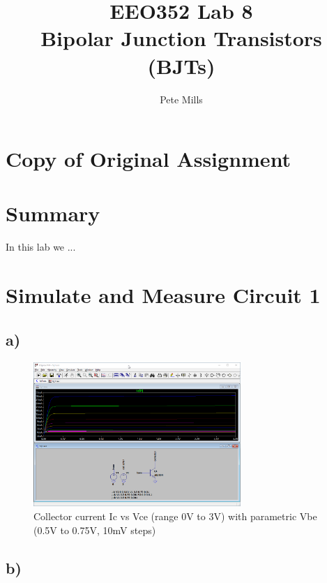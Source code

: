 \documentclass{article}
\begin{document}
	
	
	\title{EEO352 Lab 8\\ Bipolar Junction Transistors (BJTs)}
	\author{Pete Mills}
	
	\maketitle
	
	\section*{Copy of Original Assignment}
	
	
	
	
	\section*{Summary}
	
	In this lab we ...
	

	\section{Simulate and Measure Circuit 1}
	
	\subsection*{a)}

	\begin{figure}[H]
	    \centering
	    \includegraphics[width=0.7\textwidth]{1a}
	    \caption{Collector current Ic vs Vce (range 0V to 3V) with parametric Vbe (0.5V to 0.75V, 10mV steps)}
	\end{figure}
	
	\subsection*{b)}
\end{document}

